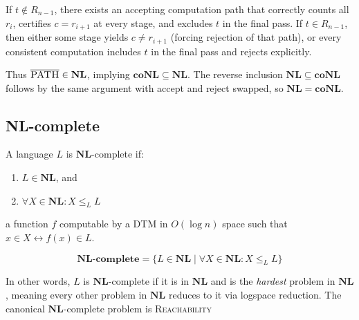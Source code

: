 \documentclass[12pt,a4paper,openany]{article}
\begin{document}
\begin{center}
\end{center}

If $t \notin R_{n-1}$, there exists an accepting computation path that correctly
counts all $r_i$, certifies $c = r_{i+1}$ at every stage, and excludes $t$ in the
final pass. If $t \in R_{n-1}$, then either some stage yields $c \neq r_{i+1}$
(forcing rejection of that path), or every consistent computation includes $t$
in the final pass and rejects explicitly.

Thus $\overline{\textsc{PATH}} \in \mathbf{NL}$, implying $\mathbf{coNL} \subseteq \mathbf{NL}$.
The reverse inclusion $\mathbf{NL} \subseteq \mathbf{coNL}$ follows by the same argument
with accept and reject swapped, so $\mathbf{NL} = \mathbf{coNL}$.


\subsection{NL-complete}

A language $L$ is $\mathbf{NL}$-complete if:

\begin{enumerate}
    \item $L \in \mathbf{NL}$, and
    \item $\forall X \in \mathbf{NL}: X \leq_L L$
\end{enumerate}

a function $f$ computable by a DTM in $O(\log n)$ space such that $x \in X \leftrightarrow f(x) \in L$.

\[
\mathbf{NL\text{-}complete} = \{ L \in \mathbf{NL} \mid \forall X \in \mathbf{NL}: X \leq_L L \}
\]

In other words, $L$ is $\mathbf{NL}$-complete if it is in $\mathbf{NL}$ and is the
\emph{hardest} problem in $\mathbf{NL}$, meaning every other problem in $\mathbf{NL}$
reduces to it via logspace reduction. The canonical $\mathbf{NL}$-complete problem is \textsc{Reachability} 
\end{document}

